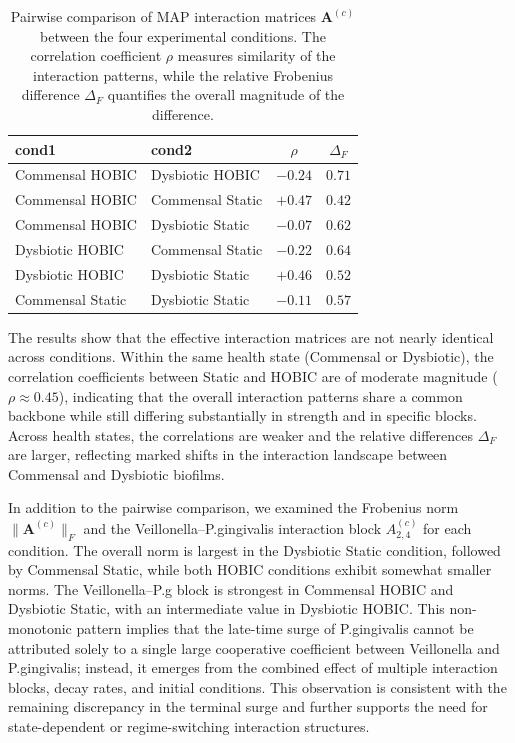 \documentclass[11pt,a4paper]{article}
\begin{document}
\begin{table}[H]
\centering
\caption{Pairwise comparison of MAP interaction matrices $\mathbf{A}^{(c)}$ between the four experimental conditions. The correlation coefficient $\rho$ measures similarity of the interaction patterns, while the relative Frobenius difference $\Delta_F$ quantifies the overall magnitude of the difference.}
\begin{tabular}{l l c c}
\hline
cond1 & cond2 & $\rho$ & $\Delta_F$ \\
\hline
Commensal HOBIC  & Dysbiotic HOBIC   & $-0.24$ & $0.71$ \\
Commensal HOBIC  & Commensal Static  & $+0.47$ & $0.42$ \\
Commensal HOBIC  & Dysbiotic Static  & $-0.07$ & $0.62$ \\
Dysbiotic HOBIC  & Commensal Static  & $-0.22$ & $0.64$ \\
Dysbiotic HOBIC  & Dysbiotic Static  & $+0.46$ & $0.52$ \\
Commensal Static & Dysbiotic Static  & $-0.11$ & $0.57$ \\
\hline
\end{tabular}
\label{tab:A_pairwise_comparison}
\end{table}

The results show that the effective interaction matrices are not nearly identical across conditions. Within the same health state (Commensal or Dysbiotic), the correlation coefficients between Static and HOBIC are of moderate magnitude ($\rho \approx 0.45$), indicating that the overall interaction patterns share a common backbone while still differing substantially in strength and in specific blocks. Across health states, the correlations are weaker and the relative differences $\Delta_F$ are larger, reflecting marked shifts in the interaction landscape between Commensal and Dysbiotic biofilms.

In addition to the pairwise comparison, we examined the Frobenius norm $\lVert \mathbf{A}^{(c)} \rVert_F$ and the Veillonella--P.gingivalis interaction block $A^{(c)}_{2,4}$ for each condition. The overall norm is largest in the Dysbiotic Static condition, followed by Commensal Static, while both HOBIC conditions exhibit somewhat smaller norms. The Veillonella--P.g block is strongest in Commensal HOBIC and Dysbiotic Static, with an intermediate value in Dysbiotic HOBIC. This non-monotonic pattern implies that the late-time surge of P.gingivalis cannot be attributed solely to a single large cooperative coefficient between Veillonella and P.gingivalis; instead, it emerges from the combined effect of multiple interaction blocks, decay rates, and initial conditions. This observation is consistent with the remaining discrepancy in the terminal surge and further supports the need for state-dependent or regime-switching interaction structures.
\end{document}
